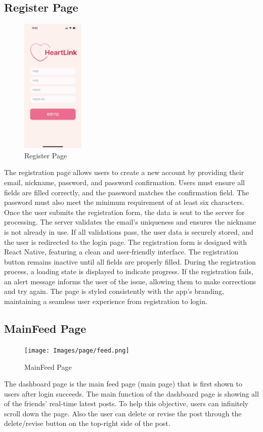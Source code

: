    \subsection{Register Page}
        \begin{figure}[htbp]
            \centerline{\includegraphics[width=3cm]{Images/page/register.jpg}}
            \caption{Register Page}
            \label{fig}
        \end{figure}
        The registration page allows users to create a new account by providing their email, nickname, password, and password confirmation. Users must ensure all fields are filled correctly, and the password matches the confirmation field. The password must also meet the minimum requirement of at least six characters. 
        Once the user submits the registration form, the data is sent to the server for processing. The server validates the email's uniqueness and ensures the nickname is not already in use. If all validations pass, the user data is securely stored, and the user is redirected to the login page. 
        The registration form is designed with React Native, featuring a clean and user-friendly interface. The registration button remains inactive until all fields are properly filled. During the registration process, a loading state is displayed to indicate progress. If the registration fails, an alert message informs the user of the issue, allowing them to make corrections and try again. 
        The page is styled consistently with the app's branding, maintaining a seamless user experience from registration to login.

   \subsection{MainFeed Page}
        \begin{figure}[htbp]
            \centerline{\texttt{[image: Images/page/feed.png]}}
            \caption{MainFeed Page}
            \label{fig}
        \end{figure}
        The dashboard page is the main feed page (main page) that is first shown to users after login succeeds. The main function of the dashboard page is showing all of the friends' real-time latest posts. To help this objective, users can infinitely scroll down the page. Also the user can delete or revise the post through the delete/revise button on the top-right side of the post.

